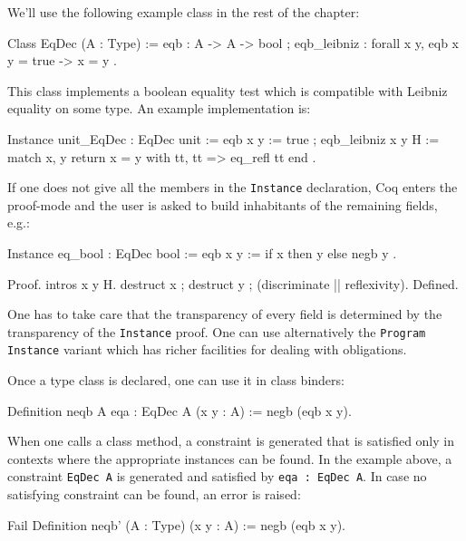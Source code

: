 We'll use the following example class in the rest of the chapter:

\begin{coq_example*}
Class EqDec (A : Type) := {
  eqb : A -> A -> bool ;
  eqb_leibniz : forall x y, eqb x y = true -> x = y }.
\end{coq_example*}

This class implements a boolean equality test which is compatible with
Leibniz equality on some type. An example implementation is:

\begin{coq_example*}
Instance unit_EqDec : EqDec unit :=
{ eqb x y := true ;
  eqb_leibniz x y H := 
    match x, y return x = y with tt, tt => eq_refl tt end }.
\end{coq_example*}

If one does not give all the members in the \texttt{Instance}
declaration, Coq enters the proof-mode and the user is asked to build
inhabitants of the remaining fields, e.g.:

\begin{coq_example*}
Instance eq_bool : EqDec bool :=
{ eqb x y := if x then y else negb y }.
\end{coq_example*}
\begin{coq_example}
Proof. intros x y H.
  destruct x ; destruct y ; (discriminate || reflexivity). 
Defined.
\end{coq_example}

One has to take care that the transparency of every field is determined
by the transparency of the \texttt{Instance} proof. One can use
alternatively the \texttt{Program} \texttt{Instance}  variant which has
richer facilities for dealing with obligations.


Once a type class is declared, one can use it in class binders:
\begin{coq_example}
Definition neqb {A} {eqa : EqDec A} (x y : A) := negb (eqb x y).
\end{coq_example}

When one calls a class method, a constraint is generated that is
satisfied only in contexts where the appropriate instances can be
found. In the example above, a constraint \texttt{EqDec A} is generated and
satisfied by \texttt{{eqa : EqDec A}}. In case no satisfying constraint can be
found, an error is raised:

\begin{coq_example}
Fail Definition neqb' (A : Type) (x y : A) := negb (eqb x y).
\end{coq_example}


